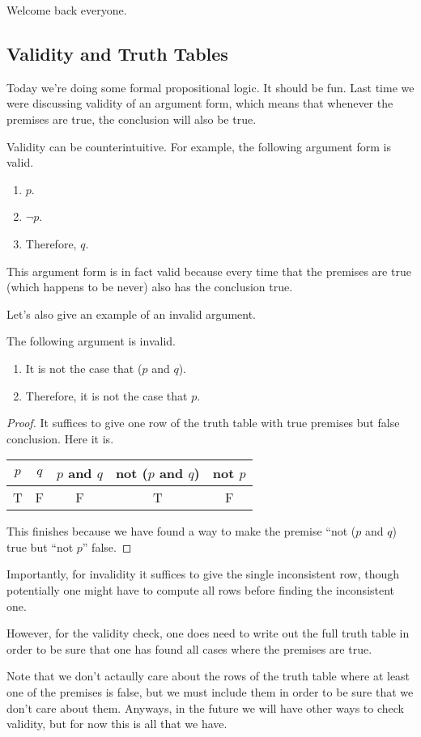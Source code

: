
Welcome back everyone.

\subsection{Validity and Truth Tables}
Today we're doing some formal propositional logic. It should be fun. Last time we were discussing validity of an argument form, which means that whenever the premises are true, the conclusion will also be true.
\begin{ex}
	Validity can be counterintuitive. For example, the following argument form is valid.
	\begin{enumerate}
		\item $p$.
		\item $\lnot p$.
		\item Therefore, $q$.
	\end{enumerate}
	This argument form is in fact valid because every time that the premises are true (which happens to be never) also has the conclusion true.
\end{ex}
Let's also give an example of an invalid argument.
\begin{exe}
	The following argument is invalid.
	\begin{enumerate}
		\item It is not the case that ($p$ and $q$).
		\item Therefore, it is not the case that $p$.
	\end{enumerate}
\end{exe}
\begin{proof}
	It suffices to give one row of the truth table with true premises but false conclusion. Here it is.
	\begin{center}
		\begin{tabular}{c|c||c|c||c}
			$p$ & $q$ & $p$ and $q$ & not ($p$ and $q$) & not $p$ \\\hline
			T & F & F & T & F
		\end{tabular}
	\end{center}
	This finishes because we have found a way to make the premise ``not ($p$ and $q$) true but ``not $p$'' false.
\end{proof}
Importantly, for invalidity it suffices to give the single inconsistent row, though potentially one might have to compute all rows before finding the inconsistent one.
\begin{warn}
	However, for the validity check, one does need to write out the full truth table in order to be sure that one has found all cases where the premises are true.
\end{warn}
Note that we don't actaully care about the rows of the truth table where at least one of the premises is false, but we must include them in order to be sure that we don't care about them. Anyways, in the future we will have other ways to check validity, but for now this is all that we have.

